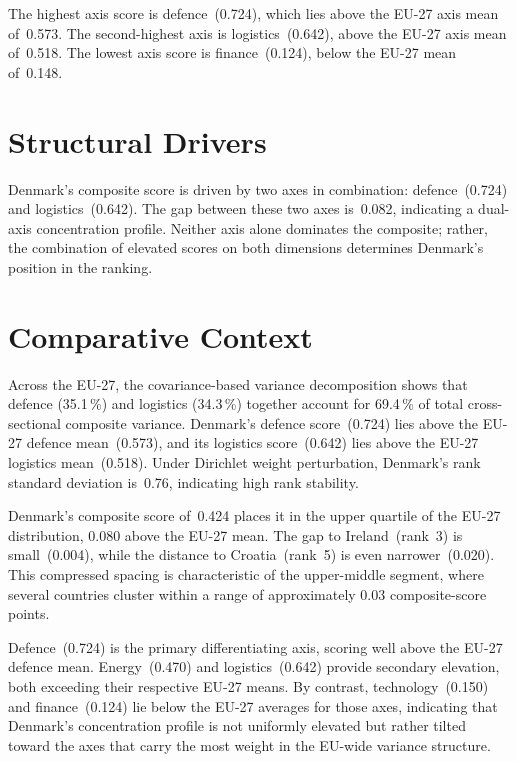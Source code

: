 \documentclass[12pt,a4paper]{article}
\begin{document}
The highest axis score is defence~(0.724), which lies above the EU-27 axis mean of~0.573.  The second-highest axis is logistics~(0.642), above the EU-27 axis mean of~0.518.  The lowest axis score is finance~(0.124), below the EU-27 mean of~0.148.


\section{Structural Drivers}
\label{sec:drivers}

\begin{sloppypar}
Denmark's composite score is driven by two axes in combination: defence~(0.724) and logistics~(0.642).  The gap between these two axes is~0.082, indicating a dual-axis concentration profile.  Neither axis alone dominates the composite; rather, the combination of elevated scores on both dimensions determines Denmark's position in the ranking.
\end{sloppypar}


\section{Comparative Context}
\label{sec:comparative}

Across the EU-27, the covariance-based variance decomposition shows that defence (35.1\,\%) and logistics (34.3\,\%) together account for 69.4\,\% of total cross-sectional composite variance.  Denmark's defence score~(0.724) lies above the EU-27 defence mean~(0.573), and its logistics score~(0.642) lies above the EU-27 logistics mean~(0.518).  Under Dirichlet weight perturbation, Denmark's rank standard deviation is~0.76, indicating high rank stability.



Denmark's composite score of~0.424 places it in the upper quartile of the EU-27 distribution, 0.080 above the EU-27 mean.  The gap to Ireland~(rank~3) is small~(0.004), while the distance to Croatia~(rank~5) is even narrower~(0.020).  This compressed spacing is characteristic of the upper-middle segment, where several countries cluster within a range of approximately 0.03 composite-score points.

Defence~(0.724) is the primary differentiating axis, scoring well above the EU-27 defence mean.  Energy~(0.470) and logistics~(0.642) provide secondary elevation, both exceeding their respective EU-27 means.  By contrast, technology~(0.150) and finance~(0.124) lie below the EU-27 averages for those axes, indicating that Denmark's concentration profile is not uniformly elevated but rather tilted toward the axes that carry the most weight in the EU-wide variance structure.
\end{document}
